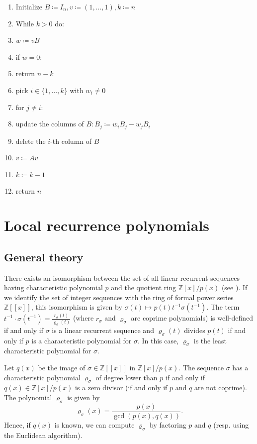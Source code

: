 \documentclass[a4paper,12pt]{article}
\begin{document}
\begin{enumerate}[topsep=0pt,itemsep=-1ex,partopsep=1ex,parsep=1ex]
\item Initialize $B \coloneqq I_n, v \coloneqq (1, \ldots, 1), k \coloneqq n$
\item While $k>0$ do:
\item \quad $w \coloneqq v B$
\item \quad if $w = 0$:
\item \quad \quad return $n-k$
\item \quad pick $i\in\{1, \ldots, k\}$ with $w_i \neq 0$
\item \quad for $j \neq i$:
\item \quad \quad update the columns of $B\colon B_j \coloneqq w_i B_j - w_j B_i$
\item \quad delete the $i$-th column of $B$
\item \quad $v \coloneqq Av$
\item \quad $k \coloneqq k-1$
\item return $n$
\end{enumerate}

\section{Local recurrence polynomials}

\subsection{General theory}

There exists an isomorphism between the set of all linear recurrent sequences having characteristic polynomial $p$ and the quotient ring $\mathbb{Z}[x]/p(x)$ (see \cite{hall1938isomorphism}). If we identify the set of integer sequences with the ring of formal power series $\mathbb{Z}[[x]]$, this isomorphism is given by $\sigma(t) \mapsto p(t) t^{-1} \sigma\left(t^{-1}\right)$. The term $t^{-1}\cdot \sigma\left(t^{-1}\right) = \frac {r_\sigma(t)}{\varrho_\sigma(t)}$ (where $r_\sigma$ and $\varrho_\sigma$ are coprime polynomials) is well-defined if and only if $\sigma$ is a linear recurrent sequence and $\varrho_\sigma(t)$ divides $p(t)$ if and only if $p$ is a characteristic polynomial for $\sigma$. In this case, $\varrho_\sigma$ is the least characteristic polynomial for $\sigma$.

Let $q(x)$ be the image of $\sigma \in \mathbb{Z}[[x]]$ in $\mathbb{Z}[x]/p(x)$. The sequence $\sigma$ has a characteristic polynomial $\varrho_\sigma$ of degree lower than $p$ if and only if $q(x) \in \mathbb{Z}[x]/p(x)$ is a zero divisor (if and only if $p$ and $q$ are not coprime). The polynomial $\varrho_\sigma$ is given by 
$$
\varrho_\sigma(x) = \frac {p(x)} {\gcd(p(x), q(x))}.
$$
Hence, if $q(x)$ is known, we can compute $\varrho_\sigma$ by factoring $p$ and $q$ (resp. using the Euclidean algorithm).
\end{document}
